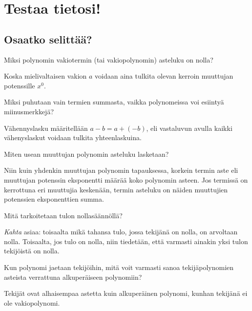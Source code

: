 \section{Testaa tietosi!}

\subsection*{Osaatko selittää?}

\begin{tehtava}
Miksi polynomin vakiotermin (tai vakiopolynomin) asteluku on nolla?
	\begin{vastaus}
	Koska mielivaltaisen vakion $a$ voidaan aina tulkita olevan kerroin muuttujan potenssille $x^0$.
	\end{vastaus}
\end{tehtava}

\begin{tehtava}
Miksi puhutaan vain termien summasta, vaikka polynomeissa voi esiintyä miinusmerkkejä?
	\begin{vastaus}
	Vähennyslasku määritellään $a-b=a+(-b)$, eli vastaluvun avulla kaikki vähenyslaskut voidaan tulkita yhteenlaskuina.
	\end{vastaus}
\end{tehtava}

\begin{tehtava}
Miten usean muuttujan polynomin asteluku lasketaan?
	\begin{vastaus}
	Niin kuin yhdenkin muuttujan polynomin tapauksessa, korkein termin aste eli muuttujan potenssin eksponentti määrää koko polynomin asteen. Jos termissä on kerrottuna eri muuttujia keskenään, termin asteluku on näiden muuttujien potenssien eksponenttien summa.
	\end{vastaus}
\end{tehtava}

\begin{tehtava}
Mitä tarkoitetaan tulon nollasäännöllä?
	\begin{vastaus}
\textit{Kahta} asiaa: toisaalta mikä tahansa tulo, jossa tekijänä on nolla, on arvoltaan nolla. Toisaalta, jos tulo on nolla, niin tiedetään, että varmasti ainakin yksi tulon tekijöistä on nolla.
	\end{vastaus}
\end{tehtava}

\begin{tehtava}
Kun polynomi jaetaan tekijöihin, mitä voit varmasti sanoa tekijäpolynomien asteista verrattuna alkuperäiseen polynomiin?
	\begin{vastaus}
Tekijät ovat alhaisempaa astetta kuin alkuperäinen polynomi, kunhan tekijänä ei ole vakiopolynomi.
	\end{vastaus}
\end{tehtava}


